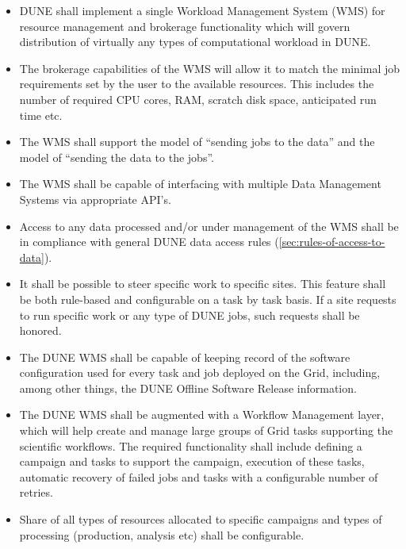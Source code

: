\begin{itemize}
	\item DUNE  shall implement a single Workload Management System (WMS) for resource management and brokerage functionality 
	which will govern  distribution of virtually any types of computational workload in DUNE.

	\item The brokerage capabilities of the WMS will allow it to match the minimal job requirements set by the user to the available
	resources. This includes the number of required CPU cores, RAM, scratch disk space, anticipated run time etc.

	\item The WMS shall support the model of ``sending jobs to the data'' and the model of ``sending the data to the jobs''.

	\item The WMS shall be capable of interfacing with multiple Data Management Systems via appropriate API's.

	\item Access to any data processed and/or under management of the WMS shall be in compliance with general DUNE 
	data access rules (\ref{sec:rules-of-access-to-data}).

	\item It shall be possible to steer specific work to specific sites.  This feature shall be both rule-based and configurable on a task by task basis.
	If a site requests to run specific work or any type of DUNE jobs, such requests shall be honored.
	
	\item The DUNE WMS shall be capable of keeping record of the software configuration used for every task and 
	job deployed on the Grid, including, among other things, the DUNE Offline Software Release information.
	
	\item The DUNE WMS shall be augmented with a Workflow Management layer, which will help create and manage large groups of Grid tasks
	supporting the scientific workflows. The required functionality shall include defining a campaign and tasks to support the campaign,
	execution of  these tasks, automatic recovery of failed jobs and tasks with a configurable number of retries.

	\item Share of all types of resources allocated to specific campaigns and types of processing (production, analysis etc) shall be configurable.
	

\end{itemize}
